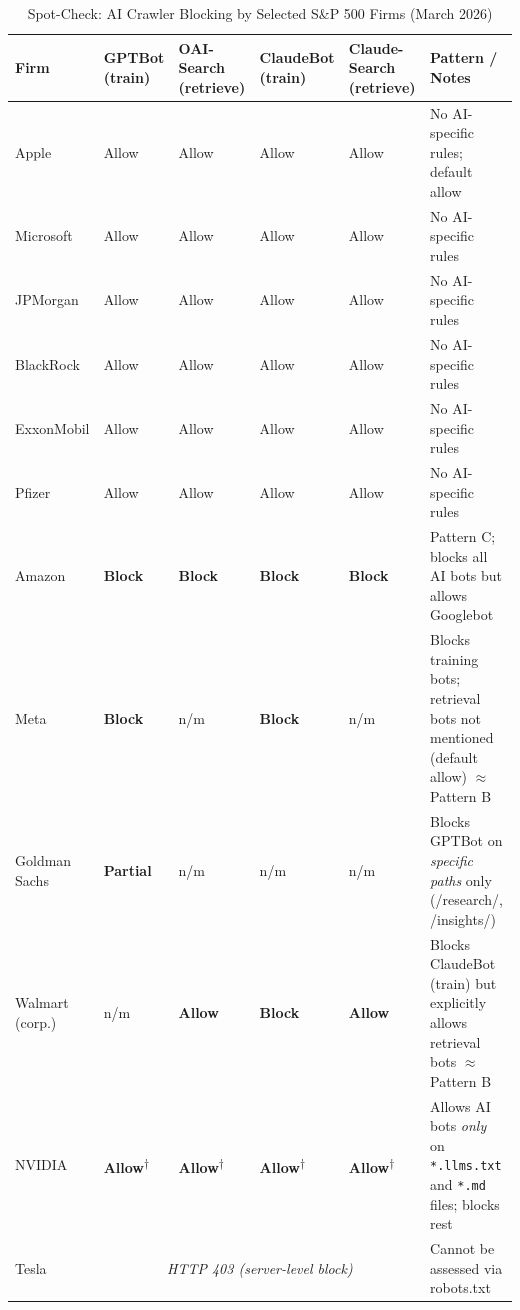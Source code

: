 \documentclass[12pt,a4paper]{article}
\begin{document}
\begin{table}[htbp]
\centering
\small
\caption{Spot-Check: AI Crawler Blocking by Selected S\&P 500 Firms (March 2026)}
\label{tab:spotcheck}
\begin{tabularx}{\textwidth}{p{2.2cm}p{1.4cm}p{1.4cm}p{1.4cm}p{1.4cm}X}
\toprule
\textbf{Firm} & \textbf{GPTBot} \newline (train) & \textbf{OAI-Search} \newline (retrieve) & \textbf{ClaudeBot} \newline (train) & \textbf{Claude-Search} \newline (retrieve) & \textbf{Pattern / Notes} \\
\midrule
Apple       & Allow & Allow & Allow & Allow & No AI-specific rules; default allow \\
\addlinespace
Microsoft   & Allow & Allow & Allow & Allow & No AI-specific rules \\
\addlinespace
JPMorgan    & Allow & Allow & Allow & Allow & No AI-specific rules \\
\addlinespace
BlackRock   & Allow & Allow & Allow & Allow & No AI-specific rules \\
\addlinespace
ExxonMobil  & Allow & Allow & Allow & Allow & No AI-specific rules \\
\addlinespace
Pfizer      & Allow & Allow & Allow & Allow & No AI-specific rules \\
\addlinespace
Amazon      & \textbf{Block} & \textbf{Block} & \textbf{Block} & \textbf{Block} & Pattern C; blocks all AI bots but allows Googlebot \\
\addlinespace
Meta        & \textbf{Block} & n/m & \textbf{Block} & n/m & Blocks training bots; retrieval bots not mentioned (default allow) $\approx$ Pattern B \\
\addlinespace
Goldman Sachs & \textbf{Partial} & n/m & n/m & n/m & Blocks GPTBot on \emph{specific paths} only (/research/, /insights/) \\
\addlinespace
Walmart (corp.) & n/m & \textbf{Allow} & \textbf{Block} & \textbf{Allow} & Blocks ClaudeBot (train) but explicitly allows retrieval bots $\approx$ Pattern B \\
\addlinespace
NVIDIA      & \textbf{Allow}\textsuperscript{$\dagger$} & \textbf{Allow}\textsuperscript{$\dagger$} & \textbf{Allow}\textsuperscript{$\dagger$} & \textbf{Allow}\textsuperscript{$\dagger$} & Allows AI bots \emph{only} on \texttt{*.llms.txt} and \texttt{*.md} files; blocks rest \\
\addlinespace
Tesla       & \multicolumn{4}{c}{\textit{HTTP 403 (server-level block)}} & Cannot be assessed via robots.txt \\

\end{tabularx}
\end{table}
\end{document}
